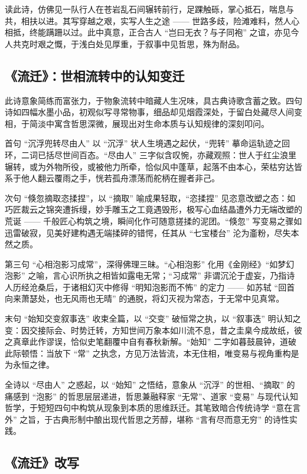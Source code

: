 \documentclass{article}
\begin{document}
读此诗，仿佛见一队行人在苍岩乱石间辗转前行，足踝触砾，掌心抵石，喘息与共，相扶以进。其写穿越之艰，实写人生之途 —— 世路多歧，险滩难料，然人心相抵，终能蹒跚以过。此中真意，正合古人 “岂曰无衣？与子同袍” 之谊，亦见今人共克时艰之慨，于浅白处见厚重，于叙事中见哲思，殊为耐品。

\subsection{《流迁》：世相流转中的认知变迁}\label{sec:liu-qian}

此诗意象简练而富张力，于物象流转中暗藏人生况味，具古典诗歌含蓄之致。四句诗如四幅水墨小品，初观似写寻常物事，细品却见烟霞深处，于留白处藏尽人间变相，于简淡中寓含哲思深微，展现出对生命本质与认知规律的深刻叩问。

首句 “沉浮兜转尽由人” 以 “沉浮” 状人生境遇之起伏，“兜转” 摹命运轨迹之回环，二词已括尽世间百态。“尽由人” 三字似含叹惋，亦藏观照：世人于红尘浪里辗转，或为外物所役，或被他力所牵，恰似风中蓬草，起落不由本心，荣枯穷达皆系于他人翻云覆雨之手，恍若孤舟漂荡而舵柄在握者非己。

次句 “倏忽摘取恣揉捏”，以 “摘取” 喻成果轻取，“恣揉捏” 见恣意改塑之态：如巧匠裁云之锦突遭拆缦，妙手雕玉之工竟遇毁形，极写心血结晶遭外力无端改塑的荒诞 —— 千般匠心构筑之境，瞬间化作可随意搓揉的泥团。“倏忽” 写变易之骤如迅雷破寂，见美好建构遇无端揉碎的错愕，任其从 “七宝楼台” 沦为齑粉，尽失本然之质。

第三句 “心相泡影习成常”，深得佛理三昧。“心相泡影” 化用《金刚经》“如梦幻泡影” 之喻，言心识所执之相皆如露电无常；“习成常” 非谓沉沦于虚妄，乃指诗人历经沧桑后，于诸相幻灭中修得 “明知泡影而不怖” 的定力 —— 如苏轼 “回首向来萧瑟处，也无风雨也无晴” 的通脱，将幻灭视为常态，于无常中见真常。

末句 “始知交变叙事迭” 收束全篇，以 “交变” 破恒常之执，以 “叙事迭” 明认知之变：因交接际会、时势迁转，方知世间万象本如川流不息，昔之圭臬今成故纸，彼之真章此作谬误，恰似史笔翻覆中自有春秋新解。“始知” 二字如暮鼓晨钟，道破此际顿悟：当放下 “常” 之执念，方见万法皆流，本无住相，唯变易与视角重构是为永恒之律。

全诗以 “尽由人” 之惑起，以 “始知” 之悟结，意象从 “沉浮” 的世相、“摘取” 的痛感到 “泡影” 的哲思层层递进，哲思兼融释家 “无常”、道家 “变易” 与现代认知哲学，于短短四句中构筑从现象到本质的思维跃迁。其笔致暗合传统诗学 “意在言外” 之旨，于古典形制中酿出现代哲思之芳醇，堪称 “言有尽而意无穷” 的诗性实践。

\subsection{《流迁》改写}\label{sec:liu-qian-extra}
\end{document}
